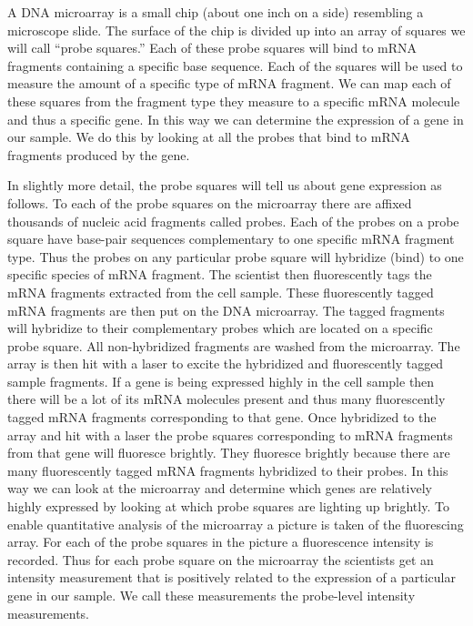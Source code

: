 \documentclass[reqno,12pt,oneside]{report}\usepackage[]{graphicx}\usepackage[]{color}
\theoremstyle{plain}
\theoremstyle{definition}
\theoremstyle{remark}
\numberwithin{theorem}{chapter}     %
\begin{document}
A DNA microarray is a small chip (about one inch on a side) resembling a microscope slide. The surface of the chip is divided up into an array of squares we will call ``probe squares.'' Each of these probe squares will bind to  mRNA fragments containing a specific base sequence. Each of the squares will be used to measure the amount of a specific type of mRNA fragment. We can map each of these squares from the fragment type they measure to a specific mRNA molecule and thus a specific gene. In this way we can determine the expression of a gene in our sample. We do this by looking at all the probes that bind to mRNA fragments produced by the gene. 

In slightly more detail, the probe squares will tell us about gene expression as follows. To each of the probe squares on the microarray there are affixed thousands of nucleic acid fragments called probes. Each of the probes on a probe square have base-pair sequences complementary to one specific mRNA fragment type. Thus the probes on any particular probe square will hybridize (bind) to one specific species of mRNA fragment. The scientist then fluorescently tags the mRNA fragments extracted from the cell sample. These fluorescently tagged mRNA fragments are then put on the DNA microarray. The tagged fragments will hybridize to their complementary probes which are located on a specific probe square. All non-hybridized fragments are washed from the microarray. The array is then hit with a laser to excite the hybridized and fluorescently tagged sample fragments. If a gene is being expressed highly in the cell sample then there will be a lot of its mRNA molecules present and thus many fluorescently tagged mRNA fragments corresponding to that gene. Once hybridized to the array and hit with a laser the probe squares corresponding to mRNA fragments from that gene will fluoresce brightly. They fluoresce brightly because there are many fluorescently tagged mRNA  fragments hybridized to their probes. In this way we can look at the microarray and determine which genes are relatively highly expressed by looking at which probe squares are lighting up brightly. To enable quantitative analysis of the microarray a picture is taken of the fluorescing array. For each of the probe squares in the picture a fluorescence intensity is recorded. Thus for each probe square on the microarray the scientists get an intensity measurement that is positively related to the expression of a particular gene in our sample. We call these measurements the probe-level intensity measurements. 
\end{document}
